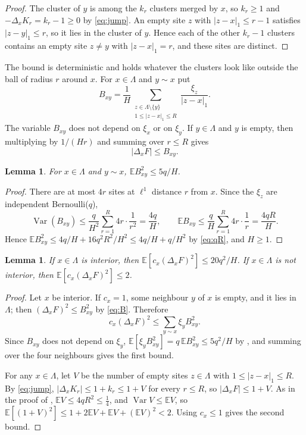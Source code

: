 \documentclass[11pt]{article}
\newtheorem{lemma}[theorem]{Lemma}
\theoremstyle{remark}
\newcommand{\E}{\mathbb E}
\newcommand{\1}{\mathbf 1}
\DeclareMathOperator{\Var}{Var}
\begin{document}
\begin{proof}
The cluster of $y$ is among the $k_r$ clusters merged by $x$, so $k_r\ge1$ and $-\Delta_xK_r=k_r-1\ge0$ by \eqref{eq:jump}. An empty site $z$ with $|z-x|_1\le r-1$ satisfies $|z-y|_1\le r$, so it lies in the cluster of $y$. Hence each of the other $k_r-1$ clusters contains an empty site $z\ne y$ with $|z-x|_1=r$, and these sites are distinct.
\end{proof}

The bound is deterministic and holds whatever the clusters look like outside the ball of radius $r$ around $x$. For $x\in\Lambda$ and $y\sim x$ put
\[
B_{xy}=\frac1H\sum_{\substack{z\in\Lambda\setminus\{y\}\\1\le|z-x|_1\le R}}\frac{\xi_z}{|z-x|_1}.
\]
The variable $B_{xy}$ does not depend on $\xi_x$ or on $\xi_y$. If $y\in\Lambda$ and $y$ is empty, then multiplying  by $1/(Hr)$ and summing over $r\le R$ gives
\begin{equation}\label{eq:B}
|\Delta_xF|\le B_{xy}.
\end{equation}

\begin{lemma}\label{lem:B}
For $x\in\Lambda$ and $y\sim x$, $\E B_{xy}^2\le 5q/H$.
\end{lemma}

\begin{proof}
There are at most $4r$ sites at $\ell^1$ distance $r$ from $x$. Since the $\xi_z$ are independent Bernoulli($q$),
\[
\Var(B_{xy})\le\frac{q}{H^2}\sum_{r=1}^R4r\cdot\frac1{r^2}=\frac{4q}{H},
\qquad
\E B_{xy}\le\frac{q}{H}\sum_{r=1}^R4r\cdot\frac1r=\frac{4qR}{H}.
\]
Hence $\E B_{xy}^2\le 4q/H+16q^2R^2/H^2\le 4q/H+q/H^2$ by \eqref{eq:qR}, and $H\ge1$.
\end{proof}

\begin{lemma}\label{lem:energy}
If $x\in\Lambda$ is interior, then $\E[c_x(\Delta_xF)^2]\le 20q^2/H$. If $x\in\Lambda$ is not interior, then $\E[c_x(\Delta_xF)^2]\le 2$.
\end{lemma}

\begin{proof}
Let $x$ be interior. If $c_x=1$, some neighbour $y$ of $x$ is empty, and it lies in $\Lambda$; then $(\Delta_xF)^2\le B_{xy}^2$ by \eqref{eq:B}. Therefore
\[
c_x(\Delta_xF)^2\le\sum_{y\sim x}\xi_yB_{xy}^2 .
\]
Since $B_{xy}$ does not depend on $\xi_y$, $\E[\xi_yB_{xy}^2]=q\,\E B_{xy}^2\le 5q^2/H$ by , and summing over the four neighbours gives the first bound.

For any $x\in\Lambda$, let $V$ be the number of empty sites $z\in\Lambda$ with $1\le|z-x|_1\le R$. By \eqref{eq:jump}, $|\Delta_xK_r|\le1+k_r\le1+V$ for every $r\le R$, so $|\Delta_xF|\le1+V$. As in the proof of , $\E V\le4qR^2\le\frac14$, and $\Var V\le\E V$, so $\E[(1+V)^2]\le1+2\E V+\E V+(\E V)^2<2$. Using $c_x\le1$ gives the second bound.
\end{proof}
\end{document}
